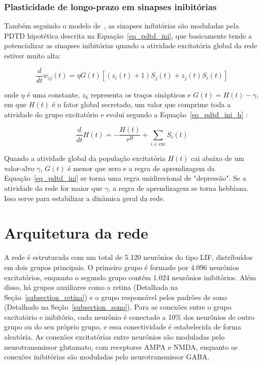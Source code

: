 \subsubsection{Plasticidade de longo-prazo em sinapses inibitórias}

Também seguindo o modelo de~, as sinapses inibitórias são moduladas pela PDTD hipotética descrita na
Equação~\ref{eq_pdtd_ini}, que basicamente tende a potencializar as sinapses inibitórias quando a atividade excitatória global da
rede estiver muito alta: 

\begin{equation}
\label{eq_pdtd_ini}
\frac{d}{dt}w_{ij}(t) = \eta G(t) [(z_i(t) + 1) S_j(t) + z_j(t) S_i(t)]
\end{equation}

\noindent{}onde $\eta$ é uma constante, $z_k$ representa os traços sinápticos e $G(t) = H(t) - \gamma$, em que $H(t)$ é o fator
global secretado, um valor que comprime toda a atividade do grupo excitatório e evolui segundo a Equação~\ref{eq_pdtd_ini_h} :

\begin{equation}
\label{eq_pdtd_ini_h}
\frac{d}{dt}H(t) = - \frac{H(t)}{\tau^H} + \sum_{i \in \text{exc}} S_i(t)
\end{equation}

Quando a atividade global da população excitatória $H(t)$ cai abaixo de um valor-alvo $\gamma$, $G(t)$ é menor que zero e a regra
de aprendizagem da Equação~\ref{eq_pdtd_ini} se torna uma regra unidirecional de "depressão". Se a atividade da rede for maior que
$\gamma$, a regra de aprendizagem se torna hebbiana. Isso serve para estabilizar a dinâmica geral da rede.

\section{Arquitetura da rede}

A rede é estruturada com um total de 5.120 neurônios do tipo LIF, distribuídos em dois grupos principais. O primeiro grupo é
formado por 4.096 neurônios excitatórios, enquanto o segundo grupo contém 1.024 neurônios inibitórios. Além disso, há grupos
auxiliares como a retina (Detalhada na Seção~\ref{subsection_retina}) e o grupo responsável pelos padrões de sono (Detalhado na
Seção~\ref{subsection_sono}). Para as conexões entre o grupo excitatório e inibitório, cada neurônio é conectado a 10\% dos
neurônios de outro grupo ou do seu próprio grupo, e essa conectividade é estabelecida de forma aleatória. As conexões excitatórias
entre neurônios são moduladas pelo neurotransmissor glutamato, com receptores AMPA e NMDA, enquanto as conexões inibitórias são
moduladas pelo neurotransmissor GABA.

